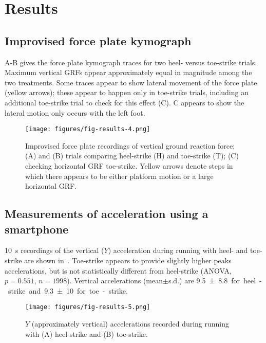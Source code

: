 \section{Results}
\label{sec:results}

\subsection{Improvised force plate kymograph}
A-B gives the force plate kymograph traces for two heel- versus toe-strike trials. Maximum vertical GRFs appear approximately equal in magnitude among the two treatments.  Some traces appear to show lateral movement of the force plate (yellow arrows); these appear to happen only in toe-strike trials, including an additional toe-strike trial to check for this effect (C). C appears to show the lateral motion only occurs with the left foot. 
\begin{figure}
\begin{center}
\texttt{[image: figures/fig-results-4.png]}
\end{center}
\caption{Improvised force plate recordings of vertical ground reaction force; (A) and (B) trials comparing heel-strike (H) and toe-strike (T); (C) checking horizontal GRF toe-strike. Yellow arrows denote steps in which there appears to be either platform motion or a large horizontal GRF.}
\label{fig:results:forceplate}
\end{figure}





\subsection{Measurements of acceleration using a smartphone}
\SI{10}{\second} recordings of the vertical ($Y$) acceleration during running with heel- and toe-strike are shown in~. Toe-strike appears to provide slightly higher peaks accelerations, but is not statistically different from heel-strike (ANOVA, $p=0.551$, $n=1998$). Vertical accelerations (mean$\pm$s.d.) are \SI{9.5\pm8.8} for heel-strike and \SI{9.3\pm10} for toe-strike. 
\begin{figure}[h]
\begin{center}
\texttt{[image: figures/fig-results-5.png]}
\end{center}
\caption{$Y$ (approximately vertical) accelerations recorded during running with (A) heel-strike and (B) toe-strike.}
\label{fig:results:accel}
\end{figure}





